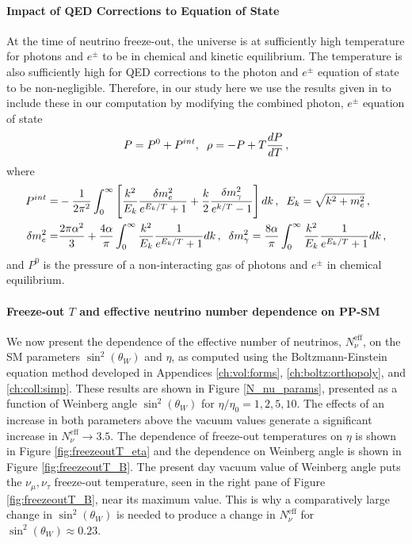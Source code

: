 \paragraph{Impact of QED Corrections to Equation of State}
At the time of neutrino freeze-out, the universe is at sufficiently high temperature for photons and $e^\pm$ to be in chemical and kinetic equilibrium.  The temperature is also sufficiently high for QED corrections to the photon and $e^\pm$ equation of state to be non-negligible.  Therefore, in our study here we use the results given in \cite{Heckler:1994tv,Mangano:2001iu} to include these in our computation by modifying the combined photon, $e^\pm$ equation of state
\begin{align}
P=P^0+P^{int},\hspace{2mm} \rho=-P+T\frac{dP}{dT}\,,
\end{align}
where
\begin{align}
P^{int}=&-\frac{1}{2\pi^2}\int_0^\infty\left[\frac{k^2}{E_k}\frac{\delta m_e^2}{e^{E_k/T}+1}+\frac{k}{2}\frac{\delta m_\gamma^2}{e^{k/T}-1}\right]dk\,,\hspace{2mm} E_k=\sqrt{k^2+m_e^2}\,,\\
\delta m_e^2=&\frac{2\pi\alpha^2}{3}+\frac{4\alpha}{\pi}\int_0^\infty \frac{k^2}{E_k}\frac{1}{e^{E_k/T}+1}dk\,,\hspace{2mm} \delta m_\gamma^2=\frac{8\alpha}{\pi}\int_0^\infty \frac{k^2}{E_k}\frac{1}{e^{E_k/T}+1}dk\,,
\end{align}
and $P^0$ is the pressure of a non-interacting gas of photons and $e^\pm$ in chemical equilibrium.

\paragraph{Freeze-out $T$ and effective neutrino number dependence on PP-SM}
We now present the  dependence of the effective number of neutrinos, $N_\nu^{\mathrm{eff}}$, on  the SM parameters   $\sin^2(\theta_W)$ and $\eta$, as computed using the Boltzmann-Einstein equation method developed in Appendices \ref{ch:vol:forms}, \ref{ch:boltz:orthopoly}, and \ref{ch:coll:simp}. These results are shown in  Figure \ref{N_nu_params}, presented as a function of  Weinberg angle $\sin^2(\theta_W) $ for $\eta/\eta_0=1,2,5,10$. The effects of an increase in both parameters above the vacuum values generate a significant increase in  $N_\nu^{\mathrm{eff}}\to 3.5$.  The dependence of freeze-out temperatures on $\eta$ is shown in Figure \ref{fig:freezeoutT_eta} and the dependence on Weinberg angle is shown in Figure \ref{fig:freezeoutT_B}. The present day vacuum value of Weinberg angle puts the $\nu_\mu,\nu_\tau$ freeze-out temperature, seen in the right pane of Figure \ref{fig:freezeoutT_B},  near its maximum value.  This is why a comparatively large change in $\sin^2(\theta_W)$ is needed to produce a change in $N_\nu^{\mathrm{eff}}$ for $\sin^2(\theta_W)\approx0.23$.  
 
